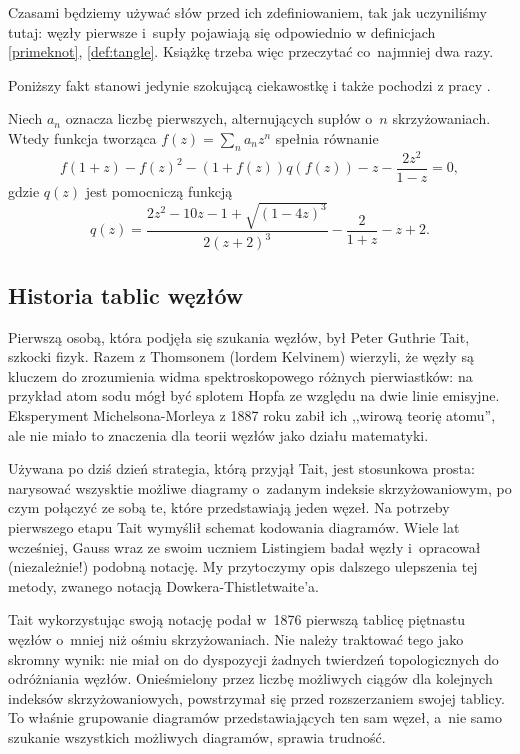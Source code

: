 {Czasami będziemy używać słów przed ich zdefiniowaniem, tak jak uczyniliśmy tutaj: węzły pierwsze i~supły pojawiają się odpowiednio w definicjach \ref{primeknot}, \ref{def:tangle}.
Książkę trzeba więc przeczytać co~najmniej dwa razy.

Poniższy fakt stanowi jedynie szokującą ciekawostkę i także pochodzi z pracy \cite{sundberg98}.

\begin{proposition}
    Niech $a_n$ oznacza liczbę pierwszych, alternujących supłów o~$n$ skrzyżowaniach.
    Wtedy funkcja tworząca $f(z) = \sum_n a_n z^n$ spełnia równanie
    \begin{equation}
    f(1+z) - f(z)^2 - (1+f(z))q(f(z)) -z - \frac{2z^2}{1-z} = 0,
    \end{equation}
    gdzie $q(z)$ jest pomocniczą funkcją
    \begin{equation}
        q(z) = \frac{2z^2 - 10z - 1 + \sqrt{(1-4z)^3}} {2(z+2)^3} - \frac{2}{1+z} -z + 2.
    \end{equation}
\end{proposition}

\subsection{Historia tablic węzłów}
Pierwszą osobą, która podjęła się szukania węzłów, był Peter Guthrie Tait, szkocki fizyk.
Razem z Thomsonem (lordem Kelvinem) wierzyli, że węzły są kluczem do zrozumienia widma spektroskopowego różnych pierwiastków: na przykład atom sodu mógł być splotem Hopfa ze względu na dwie linie emisyjne.
Eksperyment Michelsona-Morleya z 1887 roku zabił ich ,,wirową teorię atomu'', ale nie miało to znaczenia dla teorii węzłów jako działu matematyki.

Używana po dziś dzień strategia, którą przyjął Tait, jest stosunkowa prosta: narysować wszysktie możliwe diagramy o~zadanym indeksie skrzyżowaniowym, po czym połączyć ze sobą te, które przedstawiają jeden węzeł.
Na potrzeby pierwszego etapu Tait wymyślił schemat kodowania diagramów.
Wiele lat wcześniej, Gauss wraz ze swoim uczniem Listingiem badał węzły i~opracował (niezależnie!) podobną notację.
My przytoczymy opis dalszego ulepszenia tej metody, zwanego notacją Dowkera-Thistletwaite’a.

Tait wykorzystując swoją notację podał w~1876 pierwszą tablicę piętnastu węzłów o~mniej niż ośmiu skrzyżowaniach.
Nie należy traktować tego jako skromny wynik: nie miał on do dyspozycji żadnych twierdzeń topologicznych do odróżniania węzłów.
Onieśmielony przez liczbę możliwych ciągów dla kolejnych indeksów skrzyżowaniowych, powstrzymał się przed rozszerzaniem swojej tablicy.
To właśnie grupowanie diagramów przedstawiających ten sam węzeł, a~nie samo szukanie wszystkich możliwych diagramów, sprawia trudność.

}
